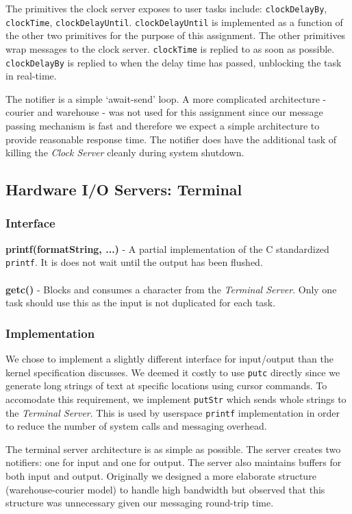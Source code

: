 \documentclass[twoside,a4paper]{refart}
\begin{document}
The primitives the clock server exposes to user tasks include: \verb~clockDelayBy~, \verb~clockTime~, \verb~clockDelayUntil~. \verb~clockDelayUntil~ is implemented as a function of the other two primitives for the purpose of this assignment. The other primitives wrap messages to the clock server. \verb~clockTime~ is replied to as soon as possible. \verb~clockDelayBy~ is replied to when the delay time has passed, unblocking the task in real-time.

The notifier is a simple ‘await-send’ loop. A more complicated architecture - courier and warehouse - was not used for this assignment since our message passing mechanism is fast and therefore we expect a simple architecture to provide reasonable response time. The notifier does have the additional task of killing the \textit{Clock Server} cleanly during system shutdown.

\subsection{Hardware I/O Servers: Terminal}

\subsubsection{Interface}
\textbf{printf(formatString, ...)} - A partial implementation of the C standardized \verb~printf~. It is does not wait until the output has been flushed.\\\\
\textbf{getc()} - Blocks and consumes a character from the \textit{Terminal Server}. Only one task should use this as the input is not duplicated for each task.

\subsubsection{Implementation}
We chose to implement a slightly different interface for input/output than the kernel specification discusses. We deemed it costly to use \verb~putc~ directly since we generate long strings of text at specific locations using cursor commands. To accomodate this requirement, we implement \verb~putStr~ which sends whole strings to the \textit{Terminal Server}. This is used by userspace \verb~printf~ implementation in order to reduce the number of system calls and messaging overhead.

The terminal server architecture is as simple as possible. The server creates two notifiers: one for input and one for output. The server also maintains buffers for both input and output. Originally we designed a more elaborate structure (warehouse-courier model) to handle high bandwidth but observed that this structure was unnecessary given our messaging round-trip time.
\end{document}
